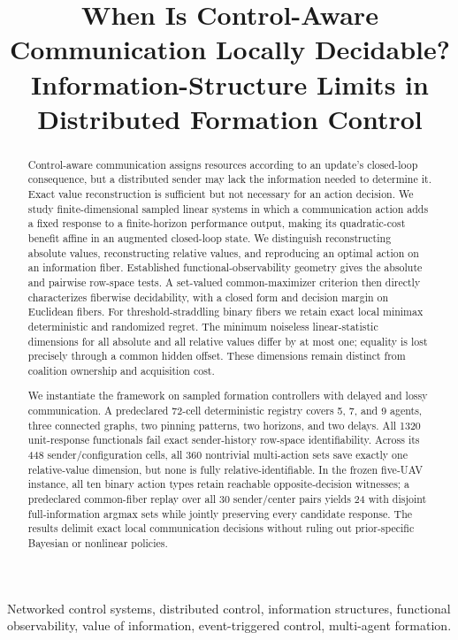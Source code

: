 \documentclass[10pt,twocolumn,twoside]{IEEEtran}
\title{When Is Control-Aware Communication Locally Decidable?\\
Information-Structure Limits in Distributed Formation Control}
\begin{document}
\maketitle

\begin{abstract}
Control-aware communication assigns resources according to an update's
closed-loop consequence, but a distributed sender may lack the information
needed to determine it.  Exact value reconstruction is sufficient but not
necessary for an action decision.  We study finite-dimensional sampled linear
systems in which a communication action adds a fixed response to a
finite-horizon performance output, making its quadratic-cost benefit affine in
an augmented closed-loop state.  We distinguish reconstructing absolute
values, reconstructing relative values, and reproducing an optimal action on
an information fiber.  Established functional-observability geometry gives
the absolute and pairwise row-space tests.  A set-valued common-maximizer
criterion then directly characterizes fiberwise decidability, with a closed
form and decision margin on Euclidean fibers.  For threshold-straddling binary
fibers we retain exact local minimax deterministic and randomized regret.
The minimum noiseless linear-statistic dimensions for all absolute and all
relative values differ by at most one; equality is lost precisely through a
common hidden offset.  These dimensions remain distinct from coalition
ownership and acquisition cost.

We instantiate the framework on sampled formation controllers with delayed
and lossy communication.  A predeclared 72-cell deterministic registry covers
5, 7, and 9 agents, three connected graphs, two pinning patterns, two horizons,
and two delays.  All 1320 unit-response functionals fail exact sender-history
row-space identifiability.  Across its 448 sender/configuration cells, all 360
nontrivial multi-action sets save exactly one relative-value dimension, but
none is fully relative-identifiable.  In the frozen five-UAV instance, all ten
binary action types retain reachable opposite-decision witnesses; a
predeclared common-fiber replay over all 30 sender/center pairs yields 24 with
disjoint full-information argmax sets while jointly preserving every candidate
response.  The results delimit exact local communication decisions without
ruling out prior-specific Bayesian or nonlinear policies.
\end{abstract}

\begin{IEEEkeywords}
Networked control systems, distributed control, information structures,
functional observability, value of information, event-triggered control,
multi-agent formation.
\end{IEEEkeywords}
\end{document}
